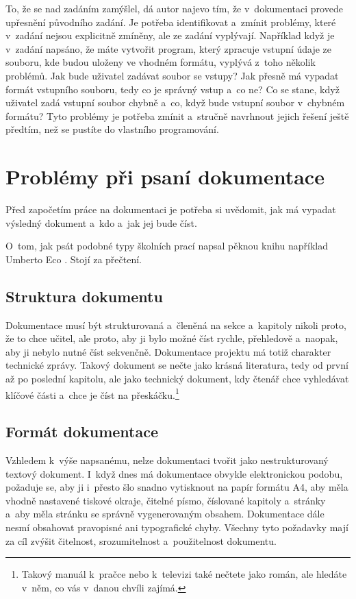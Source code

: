 To, že se nad zadáním zamýšlel, dá autor najevo tím, že v~dokumentaci provede upřesnění původního zadání. Je potřeba identifikovat a~zmínit problémy, které v~zadání nejsou explicitně zmíněny, ale ze zadání vyplývají. Například když je v~zadání napsáno, že máte vytvořit program, který zpracuje vstupní údaje ze souboru, kde budou uloženy ve vhodném formátu, vyplývá z~toho několik problémů. Jak bude uživatel zadávat soubor se vstupy? Jak přesně má vypadat formát vstupního souboru, tedy co je správný vstup a~co ne? Co se stane, když uživatel zadá vstupní soubor chybně a~co, když bude vstupní soubor v~chybném formátu? Tyto problémy je potřeba zmínit a~stručně navrhnout jejich řešení ještě předtím, než se pustíte do vlastního programování.

\section{Problémy při psaní dokumentace}
Před započetím práce na dokumentaci je potřeba si uvědomit, jak má vypadat výsledný dokument a~kdo a~jak jej bude číst.

O~tom, jak psát podobné typy školních prací napsal pěknou knihu například Umberto Eco \parencite{Eco97}. Stojí za přečtení.

\subsection{Struktura dokumentu}
Dokumentace musí být strukturovaná a~členěná na sekce a~kapitoly nikoli proto, že to chce učitel, ale proto, aby ji bylo možné číst rychle, přehledově a~naopak, aby ji nebylo nutné číst sekvenčně. Dokumentace projektu má totiž charakter technické zprávy. Takový dokument se nečte jako krásná literatura, tedy od první až po poslední kapitolu, ale jako technický dokument, kdy čtenář chce vyhledávat klíčové části a~chce je číst na přeskáčku.\footnote{Takový manuál k~pračce nebo k~televizi také nečtete jako román, ale hledáte v~něm, co vás v~danou chvíli zajímá.}

\subsection{Formát dokumentace}
Vzhledem k~výše napsanému, nelze dokumentaci tvořit jako nestrukturovaný textový dokument. I~když dnes má dokumentace obvykle elektronickou podobu, požaduje se, aby ji i~přesto šlo snadno vytisknout na papír formátu A4, aby měla vhodně nastavené tiskové okraje, čitelné písmo, číslované kapitoly a~stránky a~aby měla stránku se správně vygenerovaným obsahem. Dokumentace dále nesmí obsahovat pravopisné ani typografické chyby. Všechny tyto požadavky mají za cíl zvýšit čitelnost, srozumitelnost a~použitelnost dokumentu.

